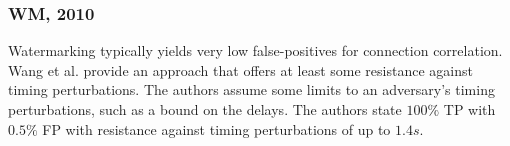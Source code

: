 \documentclass[runningheads,11pt]{llncs}\usepackage[]{graphicx}\usepackage[]{color}
\begin{document}
\subsubsection{WM, 2010}
Watermarking typically yields very low false-positives for connection correlation. %
Wang et al. \cite{wang2010robust} provide an approach that offers at least some resistance against timing perturbations. The authors assume some limits to an adversary's timing perturbations, such as a bound on the delays.%
The authors state $100\%$ TP with $0.5\%$ FP with resistance against timing perturbations of up to $1.4s$.






%
%
%
%
%

\end{document}
